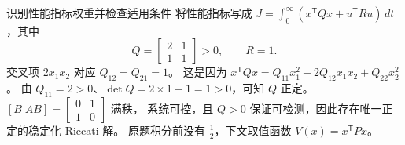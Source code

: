 \documentclass[11pt]{article}
\begin{document}
\begin{solution}
\begin{proofstep}{识别性能指标权重并检查适用条件}
将性能指标写成 $J=\int_0^\infty(x^{\mathsf T}Qx+u^{\mathsf T}Ru)\,dt$，其中
\[
 Q=\begin{bmatrix}2&1\\1&1\end{bmatrix}>0,\qquad R=1.
\]
交叉项 $2x_1x_2$ 对应 $Q_{12}=Q_{21}=1$。
这是因为 $x^{\mathsf T}Qx=Q_{11}x_1^2+2Q_{12}x_1x_2+Q_{22}x_2^2$。
由 $Q_{11}=2>0$、$\det Q=2\times1-1=1>0$，可知 $Q$ 正定。
$[B\;AB]=\begin{bmatrix}0&1\\1&0\end{bmatrix}$ 满秩，
系统可控，且 $Q>0$ 保证可检测，因此存在唯一正定的稳定化 Riccati 解。
原题积分前没有 $\tfrac12$，下文取值函数 $V(x)=x^{\mathsf T}Px$。
\end{proofstep}


\end{solution}
\end{document}
